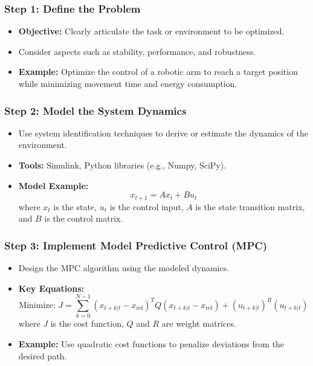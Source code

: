 \documentclass[aspectratio=169]{beamer}
\begin{document}
\begin{frame}[fragile]
    \frametitle{Step 1: Define the Problem}
    \begin{itemize}
        \item \textbf{Objective:} Clearly articulate the task or environment to be optimized.
        \item Consider aspects such as stability, performance, and robustness.
        \item \textbf{Example:} Optimize the control of a robotic arm to reach a target position while minimizing movement time and energy consumption.
    \end{itemize}
\end{frame}

\begin{frame}[fragile]
    \frametitle{Step 2: Model the System Dynamics}
    \begin{itemize}
        \item Use system identification techniques to derive or estimate the dynamics of the environment.
        \item \textbf{Tools:} Simulink, Python libraries (e.g., Numpy, SciPy).
        \item \textbf{Model Example:}
        \begin{equation}
            x_{t+1} = Ax_t + Bu_t
        \end{equation}
        where \( x_t \) is the state, \( u_t \) is the control input, \( A \) is the state transition matrix, and \( B \) is the control matrix.
    \end{itemize}
\end{frame}

\begin{frame}[fragile]
    \frametitle{Step 3: Implement Model Predictive Control (MPC)}
    \begin{itemize}
        \item Design the MPC algorithm using the modeled dynamics. 
        \item \textbf{Key Equations:}
        \begin{equation}
            \text{Minimize: } J = \sum_{k=0}^{N-1} (x_{t+k|t} - x_{\text{ref}})^T Q (x_{t+k|t} - x_{\text{ref}}) + (u_{t+k|t})^R (u_{t+k|t})
        \end{equation}
        where \( J \) is the cost function, \( Q \) and \( R \) are weight matrices.
        \item \textbf{Example:} Use quadratic cost functions to penalize deviations from the desired path.
    \end{itemize}
\end{frame}
\end{document}
